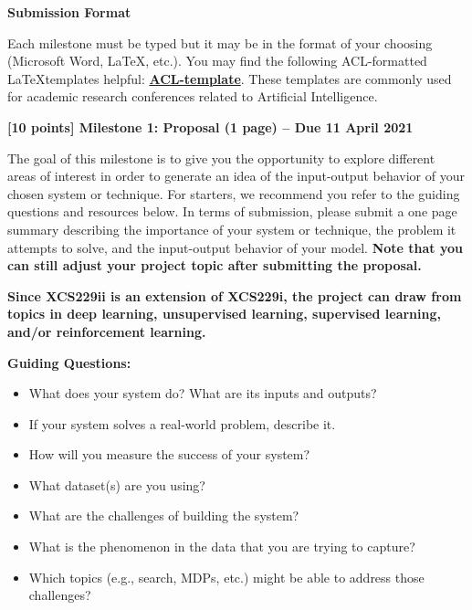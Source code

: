 \large
\textbf{Submission Format}\vspace{\baselineskip}

\normalsize
Each milestone must be typed but it may be in the format of your choosing (Microsoft Word, \LaTeX, etc.). You may find the following ACL-formatted \LaTeX \hfill templates helpful: \textbf{\href{http://acl2020.org/downloads/acl2020-templates.zip}{ACL-template}}. These templates are commonly used for academic research conferences related to Artificial Intelligence.
\clearpage

\large
\textbf{[10 points] Milestone 1: Proposal (1 page) -- Due 11 April 2021}


\normalsize
The goal of this milestone is to give you the opportunity to explore different areas of interest in order to generate an idea of the input-output behavior of your chosen system or technique. For starters, we recommend you refer to the guiding questions and resources below. In terms of submission, please submit a one page summary describing the importance of your system or technique, the problem it attempts to solve, and the input-output behavior of your model. \textbf{Note that you can still adjust your project topic after submitting the proposal.} 

\textbf{Since XCS229ii is an extension of XCS229i, the project can draw from topics in deep learning, unsupervised learning, supervised learning, and/or reinforcement learning.} \vspace{\baselineskip}

\textbf{Guiding Questions: }
\begin{itemize}
    \item What does your system do? What are its inputs and outputs?
    \item If your system solves a real-world problem, describe it.
    \item How will you measure the success of your system?
    \item What dataset(s) are you using?
    \item What are the challenges of building the system?
    \item What is the phenomenon in the data that you are trying to capture?
    \item Which topics (e.g., search, MDPs, etc.) might be able to address those challenges?
\end{itemize}
\vspace{\baselineskip}

